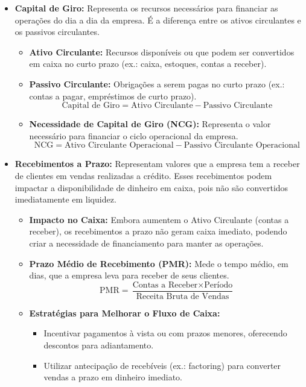 \documentclass{article}
\begin{document}
\begin{itemize}
\begin{itemize}
    \end{itemize}
    \item \textbf{Capital de Giro:} Representa os recursos necessários para financiar as operações do dia a dia da empresa. É a diferença entre os ativos circulantes e os passivos circulantes. 
\begin{itemize}
    \item \textbf{Ativo Circulante:} Recursos disponíveis ou que podem ser convertidos em caixa no curto prazo (ex.: caixa, estoques, contas a receber). 
    \item \textbf{Passivo Circulante:} Obrigações a serem pagas no curto prazo (ex.: contas a pagar, empréstimos de curto prazo). 
    \begin{equation}
        \text{Capital de Giro} = \text{Ativo Circulante} - \text{Passivo Circulante}
    \end{equation}
    \item \textbf{Necessidade de Capital de Giro (NCG):} Representa o valor necessário para financiar o ciclo operacional da empresa. 
        \begin{equation}
            \text{NCG} = \text{Ativo Circulante Operacional} - \text{Passivo Circulante Operacional}
        \end{equation}
    \end{itemize}

    \item \textbf{Recebimentos a Prazo:} Representam valores que a empresa tem a receber de clientes em vendas realizadas a crédito. Esses recebimentos podem impactar a disponibilidade de dinheiro em caixa, pois não são convertidos imediatamente em liquidez. 
\begin{itemize}
    \item \textbf{Impacto no Caixa:} Embora aumentem o Ativo Circulante (contas a receber), os recebimentos a prazo não geram caixa imediato, podendo criar a necessidade de financiamento para manter as operações. 
    \item \textbf{Prazo Médio de Recebimento (PMR):} Mede o tempo médio, em dias, que a empresa leva para receber de seus clientes. 
    \begin{equation}
        \text{PMR} = \frac{\text{Contas a Receber} \times \text{Período}}{\text{Receita Bruta de Vendas}}
    \end{equation}
    \item \textbf{Estratégias para Melhorar o Fluxo de Caixa:} 
    \begin{itemize}
        \item Incentivar pagamentos à vista ou com prazos menores, oferecendo descontos para adiantamento.
        \item Utilizar antecipação de recebíveis (ex.: factoring) para converter vendas a prazo em dinheiro imediato.
    \end{itemize}
\end{itemize}


\end{itemize}
\end{document}
